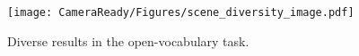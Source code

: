 \begin{figure}
\centering
\texttt{[image: CameraReady/Figures/scene\_diversity\_image.pdf]}
\caption{Diverse results in the open-vocabulary task.}
\label{scene_diversity}
\end{figure}